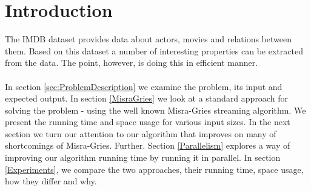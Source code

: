 \label{Introduction}
\section{Introduction}

The IMDB dataset provides data about actors, movies and relations between them. Based on this dataset a number of interesting properties can be extracted from the data. The point, however, is doing this in efficient manner.
\\
\\
In section \ref{sec:ProblemDescription} we examine the problem, its input and expected output. In section \ref{MisraGries} we look at a standard approach for solving the problem - using the well known Misra-Gries streaming algorithm. We present the running time and space usage for various input sizes. In the next section we turn our attention to our algorithm that improves on many of shortcomings of Misra-Gries. Further. Section \ref{Parallelism} explores a way of improving our algorithm running time by running it in parallel. In section \ref{Experiments}, we compare the two approaches, their running time, space usage, how they differ and why.